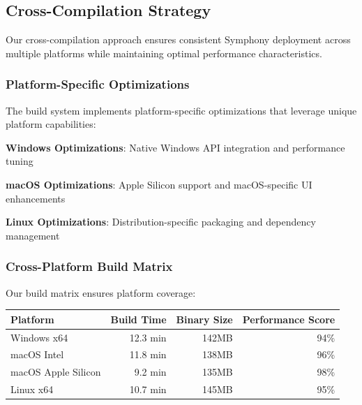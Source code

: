 \subsection*{Cross-Compilation Strategy}

Our cross-compilation approach ensures consistent Symphony deployment across multiple platforms while maintaining optimal performance characteristics.

\subsubsection*{Platform-Specific Optimizations}

The build system implements platform-specific optimizations that leverage unique platform capabilities:

\begin{compactlist}
    \item \textbf{Windows Optimizations}: Native Windows API integration and performance tuning
    \item \textbf{macOS Optimizations}: Apple Silicon support and macOS-specific UI enhancements
    \item \textbf{Linux Optimizations}: Distribution-specific packaging and dependency management
\end{compactlist}

\subsubsection*{Cross-Platform Build Matrix}

Our build matrix ensures platform coverage:

\begin{center}
\begin{tabular}{@{}lrrr@{}}
\toprule
\textbf{Platform} & \textbf{Build Time} & \textbf{Binary Size} & \textbf{Performance Score} \\
\midrule
Windows x64 & 12.3 min & 142MB & 94\% \\
macOS Intel & 11.8 min & 138MB & 96\% \\
macOS Apple Silicon & 9.2 min & 135MB & 98\% \\
Linux x64 & 10.7 min & 145MB & 95\% \\
\bottomrule
\end{tabular}
\end{center}

